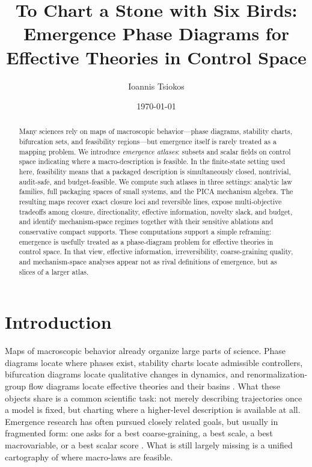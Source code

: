 \documentclass[11pt]{article}
\title{To Chart a Stone with Six Birds:\\[2pt]
Emergence Phase Diagrams for Effective Theories in Control Space}
\author{Ioannis Tsiokos \href{https://orcid.org/0009-0009-7659-5964}{\orcidicon}}
\date{\today}
\theoremstyle{definition}
\begin{document}
\maketitle
\thispagestyle{firstpage}
\begin{abstract}
Many sciences rely on maps of macroscopic behavior---phase diagrams, stability charts, bifurcation sets, and feasibility regions---but emergence itself is rarely treated as a mapping problem. We introduce \emph{emergence atlases}: subsets and scalar fields on control space indicating where a macro-description is feasible. In the finite-state setting used here, feasibility means that a packaged description is simultaneously closed, nontrivial, audit-safe, and budget-feasible. We compute such atlases in three settings: analytic law families, full packaging spaces of small systems, and the PICA mechanism algebra. The resulting maps recover exact closure loci and reversible lines, expose multi-objective tradeoffs among closure, directionality, effective information, novelty slack, and budget, and identify mechanism-space regimes together with their sensitive ablations and conservative compact supports. These computations support a simple reframing: emergence is usefully treated as a phase-diagram problem for effective theories in control space. In that view, effective information, irreversibility, coarse-graining quality, and mechanism-space analyses appear not as rival definitions of emergence, but as slices of a larger atlas.
\end{abstract}
 
\section{Introduction}
Maps of macroscopic behavior already organize large parts of science. Phase diagrams locate where phases exist, stability charts locate admissible controllers, bifurcation diagrams locate qualitative changes in dynamics, and renormalization-group flow diagrams locate effective theories and their basins \cite{chew2023phase,chiang1989stability,kuznetsov2023bifurcation,wilson1975renormalization}. What these objects share is a common scientific task: not merely describing trajectories once a model is fixed, but charting where a higher-level description is available at all. Emergence research has often pursued closely related goals, but usually in fragmented form: one asks for a best coarse-graining, a best scale, a best macrovariable, or a best scalar score \cite{hoel2013causal,hoel2017map,rosas2020reconciling}. What is still largely missing is a unified cartography of where macro-laws are feasible.
\end{document}
